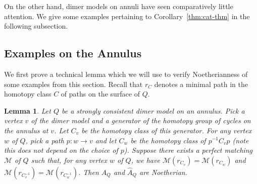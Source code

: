 \documentclass{article}
\newtheorem{lemma}[thm]{Lemma}
\theoremstyle{definition}
\begin{document}
On the other hand, dimer models on annuli have seen comparatively little attention.
We give some examples pertaining to Corollary~\ref{thm:cat-thm} in the following subsection.

\subsection{Examples on the Annulus}

We first prove a technical lemma which we will use to verify Noetherianness of some examples from this section.  Recall that $r_C$ denotes a minimal path in the homotopy class $C$ of paths on the surface of $Q$.

\begin{lemma}\label{lem:noeth}
	Let $Q$ be a strongly consistent dimer model on an annulus.
	Pick a vertex $v$ of the dimer model and a generator of the homotopy group of cycles on the annulus at $v$.  Let $C_v$ be the homotopy class of this generator. For any vertex $w$ of $Q$, pick a path $p:w\to v$ and let $C_w$ be the homotopy class of $p^{-1}C_vp$ (note this does not depend on the choice of $p$).
	Suppose there exists a perfect matching $\mathcal M$ of $Q$ such that, for any vertex $w$ of $Q$, we have $\mathcal M(r_{C_v})=\mathcal M(r_{C_w})$ and $\mathcal M(r_{C_v^{-1}})=\mathcal M(r_{C_w^{-1}})$. Then $A_Q$ and $\widehat A_Q$ are Noetherian.
\end{lemma}
\end{document}
